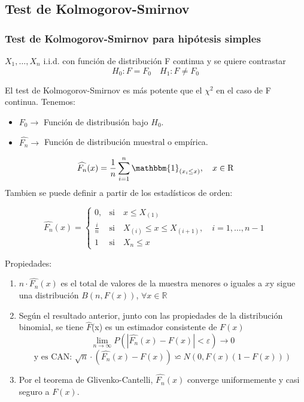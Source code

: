 \subsection{Test de Kolmogorov-Smirnov}
\subsubsection{Test de Kolmogorov-Smirnov para hipótesis simples}

$X_1,\dots, X_n$ i.i.d. con función de distribución F continua y se quiere contrastar
\[
    H_0: F=F_0 \quad H_1: F \neq F_0
\]

El test de Kolmogorov-Smirnov es más potente que el $\chi^2$ en el caso de F continua.
Tenemos:
\begin{itemize}
    \item $F_0 \to $ Función de distribusión bajo $H_0$.
    \item $\widehat{F_n} \to$ Función de distribución muestral o empírica.
\end{itemize}
\[
    \widehat{F_n}(x)=\frac{1}{n} \sum_{i=1}^{n} \mathbbm{1}_{(x_i \leq x)}, \quad x \in \mathrm{R}
\]
Tambien se puede definir a partir de los estadísticos de orden:

\[
    \widehat{F_n}(x)=
    \left\{
    \begin{array}{ll}
        0, & \text{si} \quad x \leq X_{(1)}\\
        \frac{i}{n} & \text{si} \quad X_{(i)} \leq x \leq X_{(i+1)}, \quad i=1, \dots,n-1 \\
        1 & \text{si} \quad X_n \leq x
    \end{array}
    \right.
\]
\newpage

Propiedades:
\begin{enumerate}
    \item $n\cdot \widehat{F_n}(x)$ es el total de valores de la muestra menores o iguales a $x$y sigue una distribución $B(n, F(x))$, $\forall x \in \mathbb{R}$
    \item Según el resultado anterior, junto con las propiedades de la distribución binomial, se tiene $\widehat{F}$(x) es un estimador consistente de $F(x)$
    \[
        \lim_{n \to \infty} P(|\widehat{F_n}(x) - F(x)| < \varepsilon) \to 0
    \]
    \[
        \text{y es CAN: }\sqrt{n}\cdot(\widehat{F_n}(x)-F(x))\backsimeq N(0,F(x)(1-F(x)))
    \]
    \item Por el teorema de Glivenko-Cantelli, $\widehat{F_n}(x)$ converge uniformemente y casi seguro a $F(x)$.
\end{enumerate}

